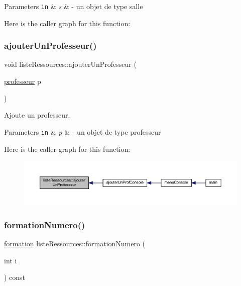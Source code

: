 \begin{DoxyParams}[1]{Parameters}
\mbox{\tt in}  & {\em s} & -\/ un objet de type salle \\
\hline
\end{DoxyParams}
Here is the caller graph for this function\+:
\hypertarget{classliste_ressources_afb8d1bb96971684ed945622b462fcd5d}{}\label{classliste_ressources_afb8d1bb96971684ed945622b462fcd5d} 
\subsubsection{\texorpdfstring{ajouter\+Un\+Professeur()}{ajouterUnProfesseur()}}
{\footnotesize\ttfamily void liste\+Ressources\+::ajouter\+Un\+Professeur (\begin{DoxyParamCaption}\item[{\hyperlink{classprofesseur}{professeur}}]{p }\end{DoxyParamCaption})}



Ajoute un professeur. 


\begin{DoxyParams}[1]{Parameters}
\mbox{\tt in}  & {\em p} & -\/ un objet de type professeur \\
\hline
\end{DoxyParams}
Here is the caller graph for this function\+:\nopagebreak
\begin{figure}[H]
\begin{center}
\leavevmode
\includegraphics[width=350pt]{classliste_ressources_afb8d1bb96971684ed945622b462fcd5d_icgraph}
\end{center}
\end{figure}
\hypertarget{classliste_ressources_aa0dc7c74caa61d02294c51fb79f7abe7}{}\label{classliste_ressources_aa0dc7c74caa61d02294c51fb79f7abe7} 
\subsubsection{\texorpdfstring{formation\+Numero()}{formationNumero()}}
{\footnotesize\ttfamily \hyperlink{classformation}{formation} liste\+Ressources\+::formation\+Numero (\begin{DoxyParamCaption}\item[{int}]{i }\end{DoxyParamCaption}) const}



